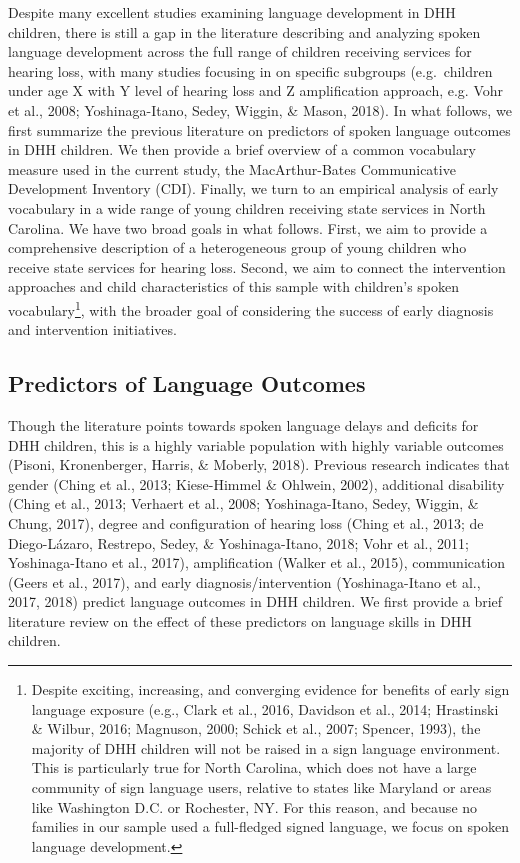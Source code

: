\documentclass[english,man]{apa6}
\begin{document}
Despite many excellent studies examining language development in DHH children, there is still a gap in the literature describing and analyzing spoken language development across the full range of children receiving services for hearing loss, with many studies focusing in on specific subgroups (e.g.~children under age X with Y level of hearing loss and Z amplification approach, e.g. Vohr et al., 2008; Yoshinaga-Itano, Sedey, Wiggin, \& Mason, 2018). In what follows, we first summarize the previous literature on predictors of spoken language outcomes in DHH children. We then provide a brief overview of a common vocabulary measure used in the current study, the MacArthur-Bates Communicative Development Inventory (CDI). Finally, we turn to an empirical analysis of early vocabulary in a wide range of young children receiving state services in North Carolina. We have two broad goals in what follows. First, we aim to provide a comprehensive description of a heterogeneous group of young children who receive state services for hearing loss. Second, we aim to connect the intervention approaches and child characteristics of this sample with children's spoken vocabulary\footnote{Despite exciting, increasing, and converging evidence for benefits of early sign language exposure (e.g., Clark et al., 2016, Davidson et al., 2014; Hrastinski \& Wilbur, 2016; Magnuson, 2000; Schick et al., 2007; Spencer, 1993), the majority of DHH children will not be raised in a sign language environment. This is particularly true for North Carolina, which does not have a large community of sign language users, relative to states like Maryland or areas like Washington D.C. or Rochester, NY. For this reason, and because no families in our sample used a full-fledged signed language, we focus on spoken language development.}, with the broader goal of considering the success of early diagnosis and intervention initiatives.

\hypertarget{predictors-of-language-outcomes}{%
\subsection{Predictors of Language Outcomes}\label{predictors-of-language-outcomes}}

Though the literature points towards spoken language delays and deficits for DHH children, this is a highly variable population with highly variable outcomes (Pisoni, Kronenberger, Harris, \& Moberly, 2018). Previous research indicates that gender (Ching et al., 2013; Kiese-Himmel \& Ohlwein, 2002), additional disability (Ching et al., 2013; Verhaert et al., 2008; Yoshinaga-Itano, Sedey, Wiggin, \& Chung, 2017), degree and configuration of hearing loss (Ching et al., 2013; de Diego-Lázaro, Restrepo, Sedey, \& Yoshinaga-Itano, 2018; Vohr et al., 2011; Yoshinaga-Itano et al., 2017), amplification (Walker et al., 2015), communication (Geers et al., 2017), and early diagnosis/intervention (Yoshinaga-Itano et al., 2017, 2018) predict language outcomes in DHH children. We first provide a brief literature review on the effect of these predictors on language skills in DHH children.
\end{document}
